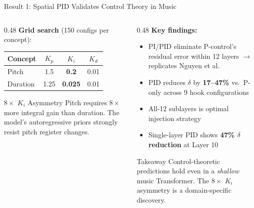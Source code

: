 \documentclass[aspectratio=169, 11pt]{beamer}
\begin{document}
\begin{frame}{Result 1: Spatial PID Validates Control Theory in Music}

\begin{columns}[T]
\begin{column}{0.48\textwidth}
\textbf{Grid search} (150 configs per concept):

\vspace{0.3em}
\begin{table}
\centering\small
\begin{tabular}{lccc}
  \toprule
  Concept & $K_p$ & $K_i$ & $K_d$ \\
  \midrule
  Pitch & 1.5 & \textbf{0.2} & 0.01 \\
  Duration & 1.25 & \textbf{0.025} & 0.01 \\
  \bottomrule
\end{tabular}
\end{table}

\begin{alertblock}{$8\times$ $K_i$ Asymmetry}
\small
Pitch requires $8\times$ more integral gain than duration. The model's autoregressive priors strongly resist pitch register changes.
\end{alertblock}
\end{column}

\begin{column}{0.48\textwidth}
\textbf{Key findings:}

\begin{itemize}
  \item PI/PID eliminate P-control's residual error within 12 layers $\to$ replicates Nguyen et al.
  \item PID reduces $\delta$ by \textbf{17--47\%} vs.\ P-only across 9 hook configurations
  \item All-12 sublayers is optimal injection strategy
  \item Single-layer PID shows \textbf{47\% $\delta$ reduction} at Layer 10
\end{itemize}

\vspace{0.3em}
\begin{exampleblock}{Takeaway}
\small
Control-theoretic predictions hold even in a \emph{shallow} music Transformer. The $8\times$ $K_i$ asymmetry is a domain-specific discovery.
\end{exampleblock}
\end{column}
\end{columns}

\end{frame}
\end{document}
